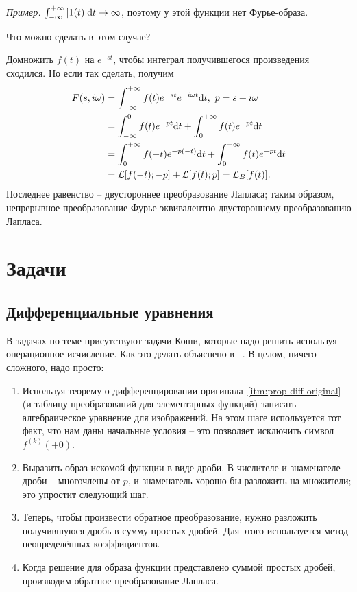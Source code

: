 \documentclass[12pt]{report}
\renewcommand{\L}{\mathcal L}
\renewcommand{\i}{i}
\begin{document}
\emph{Пример.} $\int_{-\infty}^{+\infty} |1(t)| \mathrm d t \to \infty$, поэтому у этой функции нет Фурье-образа.

Что можно сделать в этом случае? 

Домножить $f(t)$ на $e^{-st}$, чтобы интеграл получившегося произведения сходился.
Но если так сделать, получим 
\begin{align*}
F(s,\i\omega) &= \int_{-\infty}^{+\infty}f(t)e^{-st}e^{-\i\omega t}\rd t, ~ p = s + \i\omega  \\
&= \int_{-\infty}^0 f(t) e^{-pt}\rd t + \int_0^{+\infty} f(t) e^{-pt}\rd t \\
&= \int_0^{+\infty} f(-t) e^{-p(-t)}\rd t + \int_0^{+\infty} f(t) e^{-pt}\rd t \\
&= \L[f(-t); -p] + \L[f(t); p] = \L_B[f(t)].
\end{align*}
Последнее равенство -- двустороннее преобразование Лапласа; таким образом, непрерывное преобразование Фурье эквивалентно двустороннему преобразованию Лапласа.

\section{Задачи}
\subsection{Дифференциальные уравнения}
В задачах по теме присутствуют задачи Коши, которые надо решить используя операционное исчисление. Как это делать объяснено в ~\cite{difur}. В целом, ничего сложного, надо просто: 
\begin{enumerate}
	\item Используя теорему о дифференцировании оригинала~\ref{itm:prop-diff-original} (и таблицу преобразований для элементарных функций) записать алгебраическое уравнение для изображений. На этом шаге используется тот факт, что нам даны начальные условия -- это позволяет исключить символ $f^{(k)}(+0)$.
	\item Выразить образ искомой функции в виде дроби. В числителе и знаменателе дроби -- многочлены от $p$, и знаменатель хорошо бы разложить на множители; это упростит следующий шаг.
	\item Теперь,  чтобы произвести обратное преобразование, нужно разложить получившуюся дробь в сумму простых дробей. Для этого используется метод неопределённых коэффициентов.~\cite{indefinite-coef-method}
	\item Когда решение для образа функции представлено суммой простых дробей, производим обратное преобразование Лапласа. 
\end{enumerate}
\end{document}
